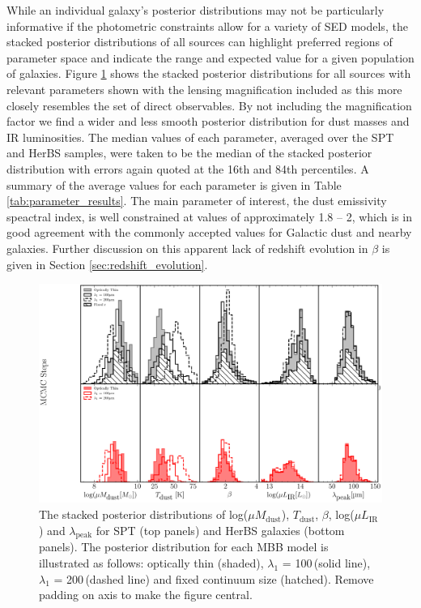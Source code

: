 While an individual galaxy's posterior distributions may not be particularly informative if the photometric constraints allow for a variety of SED models, the stacked posterior distributions of all sources can highlight preferred regions of parameter space and indicate the range and expected value for a given population of galaxies. Figure \ref{fig:stacked_posteriors} shows the stacked posterior distributions for all sources with relevant parameters shown with the lensing magnification included as this more closely resembles the set of direct observables. By not including the magnification factor we find a wider and less smooth posterior distribution for dust masses and IR luminosities. The median values of each parameter, averaged over the SPT and HerBS samples, were taken to be the median of the stacked posterior distribution with errors again quoted at the 16th and 84th percentiles. A summary of the average values for each parameter is given in Table \ref{tab:parameter_results}. The main parameter of interest, the dust emissivity speactral index, is well constrained at values of approximately 1.8 -- 2, which is in good agreement with the commonly accepted values for Galactic dust and nearby galaxies. Further discussion on this apparent lack of redshift evolution in $\beta$ is given in Section \ref{sec:redshift_evolution}. 

\begin{figure}
	\centering
	\includegraphics[width=\columnwidth]{Figures/stacked_posterior.pdf}
	\caption[Stacked posterior distributions for each MBB model]{The stacked posterior distributions of log($\mu M_{\textrm{dust}}$), $T_{\textrm{dust}}$, $\beta$, log($\mu L_{\textrm{IR}}$) and $\lambda_{\textrm{peak}}$ for SPT (top panels) and HerBS galaxies (bottom panels). The posterior distribution for each MBB model is illustrated as follows: optically thin (shaded), $\lambda_1$ = 100\,\micron (solid line), $\lambda_1$ = 200\,\micron (dashed line) and fixed continuum size (hatched). {\color{red} Remove padding on axis to make the figure central.}}
	\label{fig:stacked_posteriors}
\end{figure}

